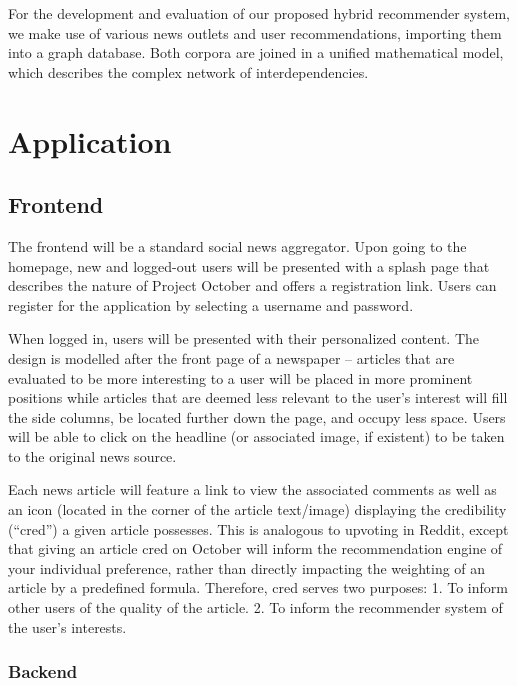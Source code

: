 \documentclass[11pt,letterpaper]{article}
\begin{document}
For the development and evaluation of our proposed hybrid recommender system, we make use of various news outlets and user recommendations, importing them into a graph database.
Both corpora are joined in a unified mathematical model, which describes the complex network of interdependencies.

\section{Application}
\subsection{Frontend}
The frontend will be a standard social news aggregator.
Upon going to the homepage, new and logged-out users will be presented with a splash page that describes the nature of Project October and offers a registration link.
Users can register for the application by selecting a username and password.

When logged in, users will be presented with their personalized content.
The design is modelled after the front page of a newspaper -- articles that are evaluated to be more interesting to a user will be placed in more prominent positions while articles that are deemed less relevant to the user's interest will fill the side columns, be located further down the page, and occupy less space.
Users will be able to click on the headline (or associated image, if existent) to be taken to the original news source.

Each news article will feature a link to view the associated comments as well as an icon (located in the corner of the article text/image) displaying the credibility (``cred'') a given article possesses.
This is analogous to upvoting in Reddit, except that giving an article cred on October will inform the recommendation engine of your individual preference, rather than directly impacting the weighting of an article by a predefined formula. Therefore, cred serves two purposes: 1. To inform other users of the quality of the article. 2. To inform the recommender system of the user's interests. 

\subsubsection{Backend}
\end{document}
